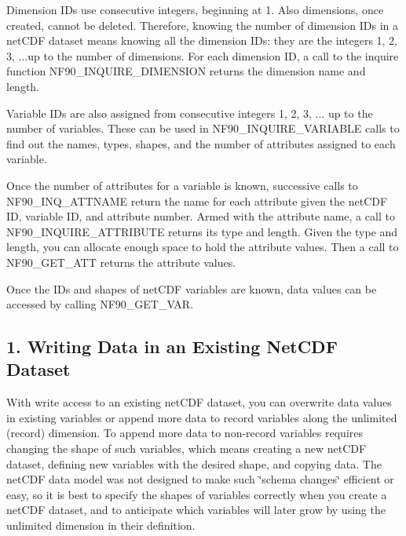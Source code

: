Dimension I\+Ds use consecutive integers, beginning at 1. Also dimensions, once created, cannot be deleted. Therefore, knowing the number of dimension I\+Ds in a net\+C\+DF dataset means knowing all the dimension I\+Ds\+: they are the integers 1, 2, 3, ...up to the number of dimensions. For each dimension ID, a call to the inquire function N\+F90\+\_\+\+I\+N\+Q\+U\+I\+R\+E\+\_\+\+D\+I\+M\+E\+N\+S\+I\+ON returns the dimension name and length.

Variable I\+Ds are also assigned from consecutive integers 1, 2, 3, ... up to the number of variables. These can be used in N\+F90\+\_\+\+I\+N\+Q\+U\+I\+R\+E\+\_\+\+V\+A\+R\+I\+A\+B\+LE calls to find out the names, types, shapes, and the number of attributes assigned to each variable.

Once the number of attributes for a variable is known, successive calls to N\+F90\+\_\+\+I\+N\+Q\+\_\+\+A\+T\+T\+N\+A\+ME return the name for each attribute given the net\+C\+DF ID, variable ID, and attribute number. Armed with the attribute name, a call to N\+F90\+\_\+\+I\+N\+Q\+U\+I\+R\+E\+\_\+\+A\+T\+T\+R\+I\+B\+U\+TE returns its type and length. Given the type and length, you can allocate enough space to hold the attribute values. Then a call to N\+F90\+\_\+\+G\+E\+T\+\_\+\+A\+TT returns the attribute values.

Once the I\+Ds and shapes of net\+C\+DF variables are known, data values can be accessed by calling N\+F90\+\_\+\+G\+E\+T\+\_\+\+V\+AR.\hypertarget{f90-use-of-the-netcdf-library_f90-writing-data-in-an-existing-netcdf-dataset}{}\subsection{1. Writing Data in an Existing Net\+C\+D\+F Dataset }\label{f90-use-of-the-netcdf-library_f90-writing-data-in-an-existing-netcdf-dataset}
With write access to an existing net\+C\+DF dataset, you can overwrite data values in existing variables or append more data to record variables along the unlimited (record) dimension. To append more data to non-\/record variables requires changing the shape of such variables, which means creating a new net\+C\+DF dataset, defining new variables with the desired shape, and copying data. The net\+C\+DF data model was not designed to make such \char`\"{}schema changes\char`\"{} efficient or easy, so it is best to specify the shapes of variables correctly when you create a net\+C\+DF dataset, and to anticipate which variables will later grow by using the unlimited dimension in their definition.


